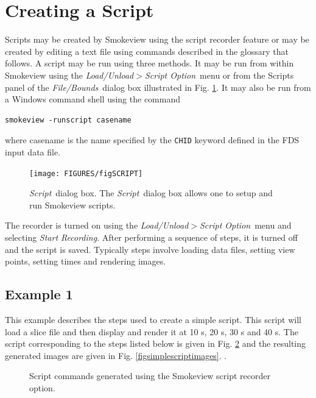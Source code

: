 \documentclass[11pt,twoside]{book}
\begin{document}
\section{Creating a Script}
Scripts may be created by Smokeview using the script recorder
feature or may be created by editing a text file using commands
described in the glossary that follows. A script may be run using
three methods.  It may be run from within Smokeview using the {\em
Load/Unload$>$Script Option}\ menu or from the Scripts panel of
the {\em File/Bounds}\ dialog box illustrated in Fig.
\ref{figSCRIPT}. It may also be run from a Windows command shell
using the command

\begin{lstlisting}
smokeview -runscript casename
\end{lstlisting}

\noindent where casename is the name specified by the {\tt CHID}
keyword defined in the FDS input data file.

\begin{figure}[\figoptions]
\centerline{
\texttt{[image: FIGURES/figSCRIPT]}
} \caption[{\em Script}\ dialog box.]{{\em Script}\ dialog box.
The {\em Script}\ dialog box allows one to setup and run Smokeview
scripts. } \label{figSCRIPT}
\end{figure}

The recorder is turned on using the
{\em Load/Unload$>$Script Option}\ menu and selecting {\em Start Recording}.
After performing a sequence of steps, it is turned off and the
script is saved. Typically steps involve loading data files,
setting view points, setting times and rendering images.

\subsection{Example 1}

This example describes the steps used to create a simple script.  This script
will load a slice file and then display and render it at 10 s, 20 s, 30 s and 40 s.
The script corresponding to the steps listed below is given
in Fig. \ref{figsimplescripttext} and the resulting generated images are given
in Fig. \ref{figsimplescriptimages}.
.
\begin{figure}[\figoptions]
\caption{Script commands generated using the Smokeview script recorder option.}
\label{figsimplescripttext}%
\end{figure}
\end{document}
